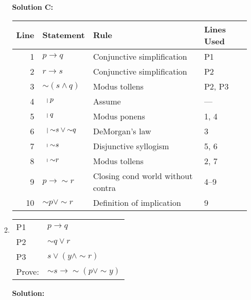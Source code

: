 \documentclass[12pt, letterpaper]{report}
\newcommand{\nott}{{\sim}}
\begin{document}
\begin{enumerate}
\begin{enumerate}
\textbf{Solution C:}
                
\begin{tabular}{|r|l|l|l|} \hline
Line & Statement & Rule & Lines Used \\ \hline
1 & $p \to q$ & Conjunctive simplification & P1 \\ \hline
2 & $r \to s$ & Conjunctive simplification & P2 \\ \hline
3 & $\nott (s \land q)$ & Modus tollens & P2, P3 \\ \hline
4 & $\ \ \vline \ p  $& Assume & --- \\ \hline
5 & $\ \ \vline \ q$ & Modus ponens & 1, 4 \\ \hline
6 & $\ \ \vline \ \nott s \lor \nott q$ & DeMorgan's law & 3 \\ \hline
7 & $\ \ \vline \ \nott s$ & Disjunctive syllogism & 5, 6\\ \hline
8 & $\ \ \vline \ \nott r$ & Modus tollens & 2, 7\\ \hline
9& $p \to \nott r$ & Closing cond world without contra & 4--9  \\ \hline
10& $\nott p \lor \nott r$ & Definition of implication & 9  \\ \hline
\end{tabular}         

                
                                
                
                \item
                        \begin{tabular}[t]{ll}
                        P1 & $p \to q$ \\
                        P2 & $\nott q \lor r$ \\
                        P3 & $s \lor (y \land \nott r)$ \\ \hline
                        Prove: & $\nott s \to \nott (p \lor \nott y)$
                \end{tabular}
                
 \textbf{Solution:}
                

\end{enumerate}
\end{enumerate}
\end{document}
